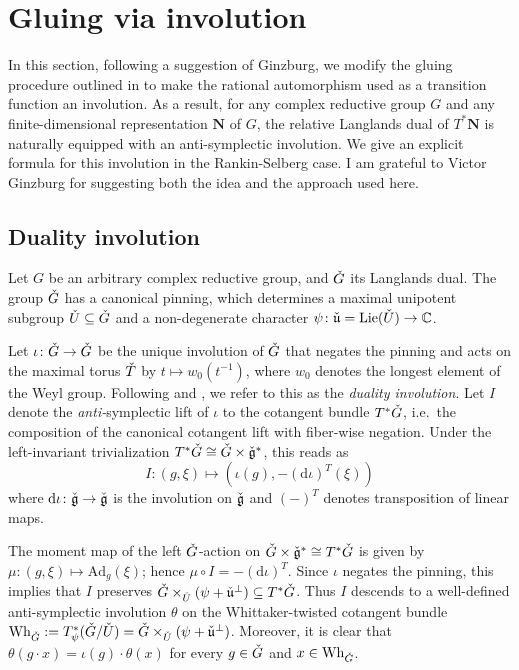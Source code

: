 \documentclass[11pt]{article}
\theoremstyle{definition}
\theoremstyle{plain}
\theoremstyle{remark}
\newcommand{\numberset}{\mathbb}
\newcommand{\C}{\numberset{C}}
\begin{document}
    
    \section{Gluing via involution}\label{section-involution}

        In this section, following a suggestion of Ginzburg, we modify the gluing procedure outlined in  to make the rational automorphism used as a transition function an involution. As a result, for any complex reductive group $G$ and any finite-dimensional representation $\mathbf{N}$ of $G$, the relative Langlands dual of $T^*\mathbf{N}$ is naturally equipped with an anti-symplectic involution. We give an explicit formula for this involution in the Rankin-Selberg case. I am grateful to Victor Ginzburg for suggesting both the idea and the approach used here.
        
        \subsection{Duality involution}

        Let $G$ be an arbitrary complex reductive group, and $\Check{G}$ its Langlands dual. The group $\Check{G}$ has a canonical pinning, which determines a maximal unipotent subgroup $\Check{U} \subseteq \Check{G}$ and a non-degenerate character $\psi\colon \Check{\mathfrak{u}} = \mathrm{Lie}(\Check{U}) \to \C$.

        Let $\iota\colon \Check{G} \to \Check{G}$ be the unique involution of $\Check{G}$ that negates the pinning and acts on the maximal torus $\Check{T}$ by $t \mapsto w_0(t^{-1})$, where $w_0$ denotes the longest element of the Weyl group. Following \cite[Section 2.3]{benzvi2024relativelanglandsduality} and \cite{Prasad2018}, we refer to this as the \emph{duality involution}. Let $I$ denote the \emph{anti-}symplectic lift of $\iota$ to the cotangent bundle $T^*\Check{G}$, i.e.\ the composition of the canonical cotangent lift with fiber-wise negation. Under the left-invariant trivialization $T^*\Check{G} \cong \Check{G} \times \Check{\mathfrak{g}}^*$, this reads as
        \[
            I\colon (g,\xi) \mapsto (\iota(g),-(\mathrm{d}\iota)^T(\xi))
        \]
        where $\mathrm{d}\iota\colon \Check{\mathfrak{g}} \to \Check{\mathfrak{g}}$ is the involution on $\Check{\mathfrak{g}}$ and $(-)^T$ denotes transposition of linear maps. 
        
        The moment map of the left $\Check{G}$-action on $\Check{G} \times \Check{\mathfrak{g}}^* \cong T^*\Check{G}$ is given by $\mu\colon (g, \xi) \mapsto \mathrm{Ad}_g(\xi)$; hence $\mu \circ I = - (\mathrm{d}\iota)^T$. Since $\iota$ negates the pinning, this implies that $I$ preserves $\Check{G} \times_{\Check{U}} (\psi + \Check{\mathfrak{u}}^\perp) \subseteq T^*\Check{G}$. Thus $I$ descends to a well-defined anti-symplectic involution $\theta$ on the Whittaker-twisted cotangent bundle $\mathrm{Wh}_{\Check{G}} := T^*_{\psi}(\Check{G}/\Check{U}) = \Check{G} \times_{\Check{U}} (\psi + \Check{\mathfrak{u}}^\perp)$. Moreover, it is clear that $\theta(g \cdot x) = \iota(g) \cdot \theta(x)$ for every $g \in \Check{G}$ and $x \in \mathrm{Wh}_{\Check{G}}$.
        
\end{document}
